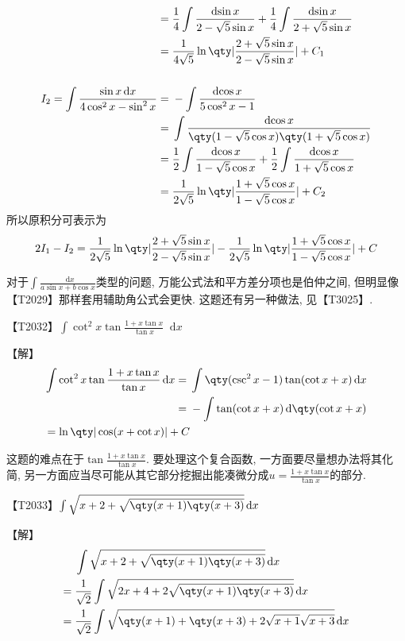 \documentclass{ctexbook}
\newcommand*{\dif}{\mathop{}\!\mathrm{d}}
\begin{document}
{\begin{align*}
={}&\frac{1}{4}\int\frac{\dif{\sin{x}}}{2-\sqrt{5}\sin{x}}+\frac{1}{4}\int\frac{\dif{\sin{x}}}{2+\sqrt{5}\sin{x}}\\
={}&\frac{1}{4\sqrt{5}}\ln\qty|\frac{2+\sqrt{5}\sin{x}}{2-\sqrt{5}\sin{x}}|+C_{1}\\
\\
I_{2}=\int\frac{\sin{x}\dif{x}}{4\cos^{2}{x}-\sin^{2}{x}}={}&-\int\frac{\dif{\cos{x}}}{5\cos^{2}{x}-1}\\
={}&\int\frac{\dif{\cos{x}}}{\qty(1-\sqrt{5}\cos{x})\qty(1+\sqrt{5}\cos{x})}\\
={}&\frac{1}{2}\int\frac{\dif{\cos{x}}}{1-\sqrt{5}\cos{x}}+\frac{1}{2}\int\frac{\dif{\cos{x}}}{1+\sqrt{5}\cos{x}}\\
={}&\frac{1}{2\sqrt{5}}\ln\qty|\frac{1+\sqrt{5}\cos{x}}{1-\sqrt{5}\cos{x}}|+C_{2}
\end{align*}
所以原积分可表示为
\begin{align*}
2I_{1}-I_{2}=\frac{1}{2\sqrt{5}}\ln\qty|\frac{2+\sqrt{5}\sin{x}}{2-\sqrt{5}\sin{x}}|-\frac{1}{2\sqrt{5}}\ln\qty|\frac{1+\sqrt{5}\cos{x}}{1-\sqrt{5}\cos{x}}|+C
\end{align*}\par
{\kaishu 对于$\int\frac{\dif{x}}{a\sin{x}+b\cos{x}}$类型的问题, 万能公式法和平方差分项也是伯仲之间, 但明显像{\color{red}【T2029】}那样套用辅助角公式会更快. 这题还有另一种做法, 见{\color{red}【T3025】}. \par}
【T2032】$\int\cot^{2}{x}\tan{\frac{1+x\tan{x}}{\tan{x}}}\dif{x}$\par
【解】
\begin{align*}
\int\cot^{2}{x}\tan{\frac{1+x\tan{x}}{\tan{x}}}\dif{x}={}&\int\qty(\csc^{2}{x}-1)\tan(\cot{x}+x)\dif{x}\\
={}&-\int\tan(\cot{x}+x)\dif{\qty(\cot{x}+x)}\\
=\ln\qty|\cos(x+\cot{x})|+C
\end{align*}\par
{\kaishu 这题的难点在于$\tan{\frac{1+x\tan{x}}{\tan{x}}}$. 要处理这个复合函数, 一方面要尽量想办法将其化简, 另一方面应当尽可能从其它部分挖掘出能凑微分成$u=\frac{1+x\tan{x}}{\tan{x}}$的部分. \par}
【T2033】$\int\sqrt{x+2+\sqrt{\qty(x+1)\qty(x+3)}}\dif{x}$\par
【解】
\begin{align*}
{}&\int\sqrt{x+2+\sqrt{\qty(x+1)\qty(x+3)}}\dif{x}\\
={}&\frac{1}{\sqrt{2}}\int\sqrt{2x+4+2\sqrt{\qty(x+1)\qty(x+3)}}\dif{x}\\
={}&\frac{1}{\sqrt{2}}\int\sqrt{\qty(x+1)+\qty(x+3)+2\sqrt{x+1}\sqrt{x+3}}\dif{x}\\

\end{align*}}
\end{document}
